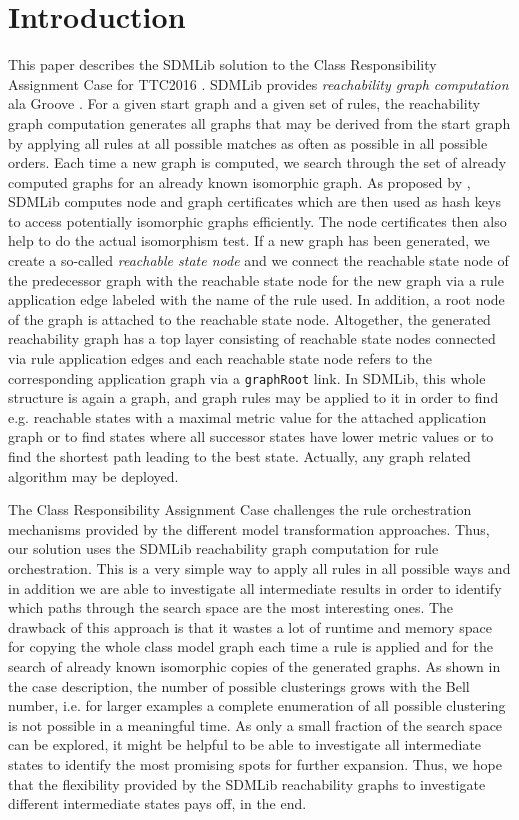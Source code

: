 \documentclass[a4paper]{article}
\begin{document}
\section{Introduction}
\label{sec:intro}

This paper describes the SDMLib solution to the Class Responsibility Assignment Case for TTC2016
\cite{ttc2016-case}. SDMLib provides \emph{reachability graph computation} ala Groove 
\cite{rensink2003groove}. For a given start graph and a given set of rules, 
the reachability graph computation generates all graphs that may be derived from 
the start graph by applying all rules at all 
possible matches as often as possible in all possible orders. Each time a new 
graph is 
computed, we search through the set of already computed graphs for an already known 
isomorphic graph. As proposed by \cite{rensink2003groove}, SDMLib computes node and graph 
certificates which are then used as hash keys to access potentially isomorphic 
graphs efficiently. The node certificates then also help to do the actual 
isomorphism test. If a new 
graph has been generated, we create a so-called \emph{reachable state 
node} and we connect the reachable state node of the predecessor graph with the reachable 
state node for the new graph via a rule application edge labeled with the name of 
the rule used. In addition, a root node of the graph is attached to the reachable state node. 
Altogether, the generated reachability graph has a top layer consisting of reachable 
state nodes connected via rule application edges and each reachable state node refers to 
the corresponding application graph via a \texttt{graphRoot} link. In SDMLib, this whole 
structure is again a graph, and graph rules may be applied to it in order to find e.g. 
reachable states with a maximal metric value for the attached application graph 
or to find states 
where all successor states have lower metric values or to find the shortest path leading to 
the best state. Actually, any graph related algorithm may be deployed.  

The Class Responsibility Assignment Case challenges the rule orchestration mechanisms 
provided by the different model transformation approaches. Thus, our solution uses the SDMLib 
reachability graph computation for rule orchestration. This is a very simple way to apply 
all rules in all possible ways and in addition we are able to investigate all intermediate 
results in order to identify which paths through the search space are the most interesting 
ones. The drawback of this approach is that it wastes a lot of runtime and memory space 
for copying the whole class model graph each time a rule is applied and for the search of 
already known isomorphic copies of the generated graphs. As shown in the case 
description, the number of possible clusterings grows with the Bell number, i.e. 
for larger examples a complete enumeration of all possible clustering is not possible in a 
meaningful time. As only a small fraction of the search space can be explored, it might be 
helpful to be able to investigate all intermediate states to identify the most promising spots 
for further expansion. Thus, we hope that the flexibility provided by the SDMLib reachability 
graphs to investigate different intermediate states pays off, in the end. 
\end{document}
